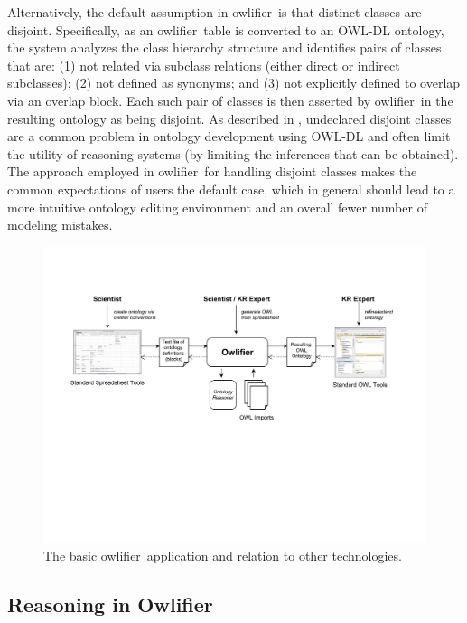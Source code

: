 \documentclass[5p,authoryear]{elsarticle}
\newcommand{\Owlifier}{\textsf{Owlifier}}
\newcommand{\owlifier}{\textsf{owlifier}}
\begin{document}
Alternatively, the default assumption in \owlifier\ is that distinct
classes are disjoint. Specifically, as an \owlifier\ table is
converted to an OWL-DL ontology, the system analyzes the class
hierarchy structure and identifies pairs of classes that are: (1) not
related via subclass relations (either direct or indirect subclasses);
(2) not defined as synonyms; and (3) not explicitly defined to overlap
via an overlap block. Each such pair of classes is then asserted by
\owlifier\ in the resulting ontology as being disjoint. As described
in \citep{rector04:_owl_pizzas}, undeclared disjoint classes are a
common problem in ontology development using OWL-DL and often limit
the utility of reasoning systems (by limiting the inferences that can
be obtained). The approach employed in \owlifier\ for handling
disjoint classes makes the common expectations of users the default
case, which in general should lead to a more intuitive ontology
editing environment and an overall fewer number of modeling mistakes.



\begin{figure}
  \centering
  \includegraphics[scale=.75]{architecture.pdf}
  \caption{The basic \owlifier\ application and relation to other
    technologies.}
  \label{fig:owlifier}
\end{figure}



\subsection{Reasoning in \Owlifier}
\end{document}
